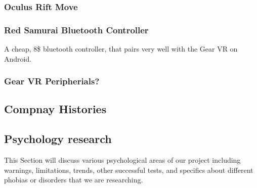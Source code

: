 \documentclass[a4paper,10pt]{article}
\begin{document}
\subsubsection{Oculus Rift Move}
\subsubsection{Red Samurai Bluetooth Controller}
	A cheap, 8\$ bluetooth controller, that pairs very well with the Gear VR on Android.
\subsubsection{Gear VR Peripherials?}
\pagebreak
\subsection{Compnay Histories}
\subsection {Psychology research}
This Section will discuss various psychological areas of our project including warnings, limitations, trends, other successful tests, and specifics about different phobias or disorders 
that we are researching. 
\end{document}
